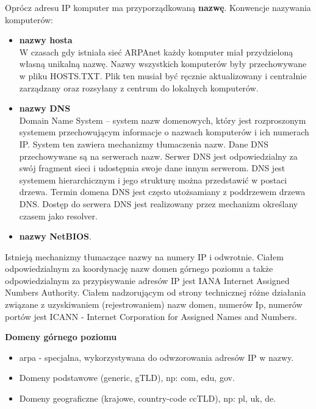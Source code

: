 \documentclass[../main.tex]{subfiles}
\begin{document}
    Oprócz adresu IP komputer ma
    przyporządkowaną \textbf{nazwę}. Konwencje nazywania komputerów:
    \begin{itemize}
        \item \textbf{nazwy hosta}\\
        W czasach gdy istniała sieć ARPAnet każdy komputer miał przydzieloną własną
        unikalną nazwę. Nazwy wszystkich komputerów były przechowywane w pliku HOSTS.TXT.
        Plik ten musiał być ręcznie aktualizowany i centralnie zarządzany oraz rozsyłany z centrum
        do lokalnych komputerów.
        \item \textbf{nazwy DNS}\\
        Domain Name System – system nazw domenowych, który jest rozproszonym systemem
        przechowującym informacje o nazwach komputerów i ich numerach IP. System ten zawiera
        mechanizmy tłumaczenia nazw. Dane DNS przechowywane są na serwerach nazw. Serwer DNS jest
        odpowiedzialny za swój fragment sieci i udostępnia swoje dane innym serwerom. DNS jest systemem hierarchicznym i jego strukturę można przedstawić w
        postaci drzewa. Termin domena DNS jest często utożsamiany z poddrzewem drzewa DNS. Dostęp do serwera DNS jest realizowany przez mechanizm określany czasem jako resolver.

        \item \textbf{nazwy NetBIOS}.

    \end{itemize}

    Istnieją mechanizmy tłumaczące nazwy na numery IP i odwrotnie.
    Ciałem odpowiedzialnym za koordynację nazw domen górnego poziomu a także
    odpowiedzialnym za przypisywanie adresów IP jest IANA Internet Assigned Numbers
    Authority.
    Ciałem nadzorującym od strony technicznej różne działania związane z uzyskiwaniem
    (rejestrowaniem) nazw domen, numerów Ip, numerów portów jest ICANN - Internet
    Corporation for Assigned Names and Numbers.

    \textbf{Domeny górnego poziomu}
    \begin{itemize}
        \item arpa - specjalna, wykorzystywana do odwzorowania adresów IP w nazwy.
        \item Domeny podstawowe (generic, gTLD), np: com, edu, gov.
        \item Domeny geograficzne (krajowe, country-code ccTLD), np: pl, uk, de.
    \end{itemize}
\end{document}
